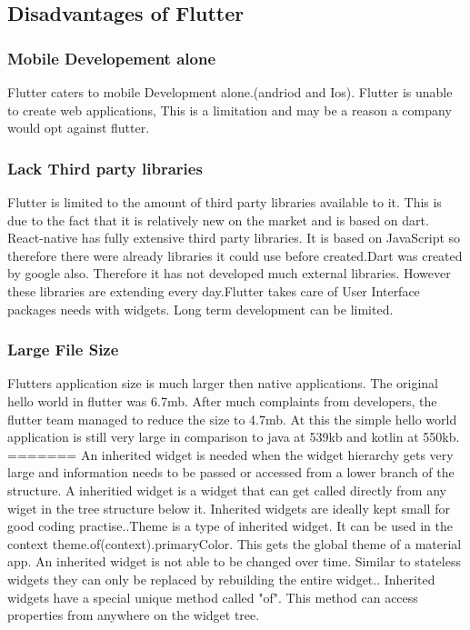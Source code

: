 \subsection{Disadvantages of Flutter}

\subsubsection{Mobile Developement alone}
Flutter caters to mobile Development alone.(andriod and Ios). Flutter is unable to create web applications, This is a limitation and may be a reason a company would opt against flutter.

\subsubsection{Lack Third party libraries}
Flutter is limited to the amount of third party libraries available to it. This is due to the fact that it is relatively new on the market and is based on dart.\cite{pros_cons} React-native has fully extensive third party libraries. It is based on JavaScript so therefore there were already libraries it could use before created.Dart was created by google also. Therefore it has not developed much external libraries. However these libraries are extending every day.Flutter takes care of User Interface packages needs with widgets. Long term development can be limited.\cite{good_bad}

\subsubsection{Large File Size}
Flutters application size is much larger then native applications. The original hello world in flutter was 6.7mb. After much complaints from developers, the flutter team managed to reduce the size to 4.7mb. At this the simple hello world application is still very large in comparison to java at 539kb and kotlin at 550kb.\cite{faq_2019} \cite{good_bad}
=======
An inherited widget is needed when the widget hierarchy gets very large and  information needs to be passed or accessed from a lower branch of the structure. A inheritied widget is a widget that can get called directly from any wiget in the tree structure below it. Inherited widgets are ideally kept small for good coding practise.\cite{fidanboylu_2019}.Theme is a type of inherited widget. It can be used in the context theme.of(context).primaryColor. This gets the global theme of a material app. An inherited widget is not able to be changed over time. Similar to stateless widgets they can only be replaced by rebuilding the entire widget.\cite{inherited_widgets}. Inherited widgets have a special unique method called "of". This method can access properties from anywhere on the widget tree.\cite{inheritedwidget_2018}

